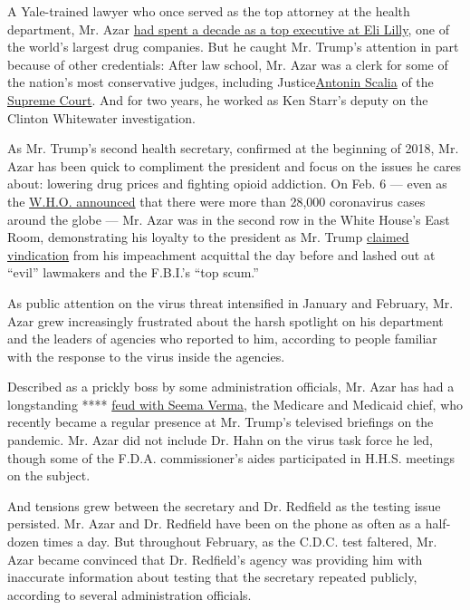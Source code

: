 A Yale-trained lawyer who once served as the top attorney at the health
department, Mr. Azar
\href{https://www.nytimes3xbfgragh.onion/2017/11/26/us/politics/alex-azar-senate-confirmation-hearing-hhs.html}{had
spent a decade as a top executive at Eli Lilly}, one of the world's
largest drug companies. But he caught Mr. Trump's attention in part
because of other credentials: After law school, Mr. Azar was a clerk for
some of the nation's most conservative judges, including
Justice\href{https://en.wikipedia.org/wiki/Antonin_Scalia}{Antonin
Scalia} of the
\href{https://en.wikipedia.org/wiki/United_States_Supreme_Court}{Supreme
Court}. And for two years, he worked as Ken Starr's deputy on the
Clinton Whitewater investigation.

As Mr. Trump's second health secretary, confirmed at the beginning of
2018, Mr. Azar has been quick to compliment the president and focus on
the issues he cares about: lowering drug prices and fighting opioid
addiction. On Feb. 6 --- even as the
\href{https://www.marketwatch.com/story/coronavirus-update-565-deaths-more-than-28000-cases-worldwide-yum-china-reports-significant-interruption-2020-02-06}{W.H.O.
announced} that there were more than 28,000 coronavirus cases around the
globe --- Mr. Azar was in the second row in the White House's East Room,
demonstrating his loyalty to the president as Mr. Trump
\href{https://www.nytimes3xbfgragh.onion/2020/02/06/us/politics/trump-impeachment.html}{claimed
vindication} from his impeachment acquittal the day before and lashed
out at ``evil'' lawmakers and the F.B.I.'s ``top scum.''

As public attention on the virus threat intensified in January and
February, Mr. Azar grew increasingly frustrated about the harsh
spotlight on his department and the leaders of agencies who reported to
him, according to people familiar with the response to the virus inside
the agencies.

Described as a prickly boss by some administration officials, Mr. Azar
has had a longstanding ****
\href{https://www.nytimes3xbfgragh.onion/2019/12/10/us/politics/trump-seema-verma-azar.html}{feud
with Seema Verma}, the Medicare and Medicaid chief, who recently became
a regular presence at Mr. Trump's televised briefings on the pandemic.
Mr. Azar did not include Dr. Hahn on the virus task force he led, though
some of the F.D.A. commissioner's aides participated in H.H.S. meetings
on the subject.

And tensions grew between the secretary and Dr. Redfield as the testing
issue persisted. Mr. Azar and Dr. Redfield have been on the phone as
often as a half-dozen times a day. But throughout February, as the
C.D.C. test faltered, Mr. Azar became convinced that Dr. Redfield's
agency was providing him with inaccurate information about testing that
the secretary repeated publicly, according to several administration
officials.

